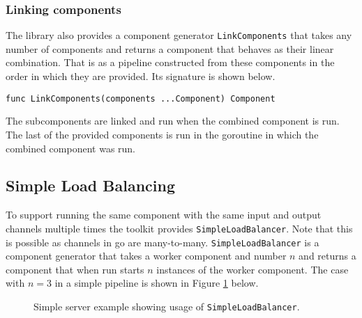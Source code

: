 \documentclass[12pt,a4paper]{article}
\begin{document}
\subsubsection{Linking components}
The library also provides a component generator \texttt{LinkComponents} that takes 
any number of components and returns a component that behaves as their 
linear combination. That is as a pipeline constructed from these components 
in the order in which they are provided. Its signature is shown below.
\begin{lstlisting}
func LinkComponents(components ...Component) Component
\end{lstlisting}
The subcomponents are linked and run when the combined component is run. 
The last of the provided components is run in the goroutine in which
the combined component was run.

\subsection{Simple Load Balancing}
To support running the same component with the same input and output 
channels multiple times the toolkit provides \texttt{SimpleLoadBalancer}.
Note that this is possible as channels in go are many-to-many.
\texttt{SimpleLoadBalancer} is a component generator that takes a worker 
component and number $n$ and returns a component that when run starts 
$n$ instances of the worker component. The case with $n=3$ in a simple 
pipeline is shown in Figure \ref{fig:slbEx} below.
\begin{figure}[h]
\centering
\vspace*{-0.5cm}
\caption[scale=1.0]{Simple server example showing usage of \texttt{SimpleLoadBalancer}.}
\label{fig:slbEx}
\vspace*{-0.5cm}
\end{figure}
\end{document}
